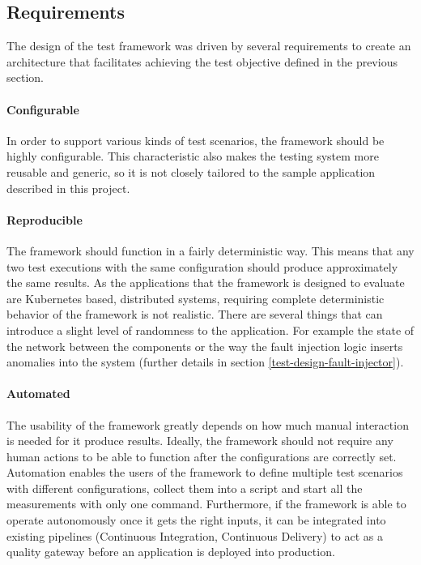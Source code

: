 \subsection{Requirements} \label{test-design-req}

The design of the test framework was driven by several requirements to create an architecture that facilitates achieving the test objective defined in the previous section.

\paragraph{Configurable} In order to support various kinds of test scenarios, the framework should be highly configurable. This characteristic also makes the testing system more reusable and generic, so it is not closely tailored to the sample application described in this project.

\paragraph{Reproducible} The framework should function in a fairly deterministic way. This means that any two test executions with the same configuration should produce approximately the same results. As the applications that the framework is designed to evaluate are Kubernetes based, distributed systems, requiring complete deterministic behavior of the framework is not realistic. There are several things that can introduce a slight level of randomness to the application. For example the state of the network between the components or the way the fault injection logic inserts anomalies into the system (further details in section \ref{test-design-fault-injector}).

\paragraph{Automated} The usability of the framework greatly depends on how much manual interaction is needed for it produce results. Ideally, the framework should not require any human actions to be able to function after the configurations are correctly set. Automation enables the users of the framework to define multiple test scenarios with different configurations, collect them into a script and start all the measurements with only one command. Furthermore, if the framework is able to operate autonomously once it gets the right inputs, it can be integrated into existing pipelines (Continuous Integration, Continuous Delivery) to act as a quality gateway before an application is deployed into production.

